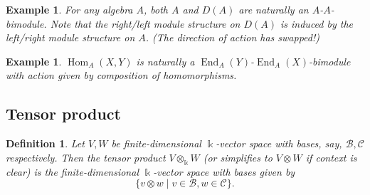 \documentclass[11pt,a4paper]{article}
\numberwithin{equation}{section}
\theoremstyle{all}
\newtheorem{example}[theorem]{Example}
\newtheorem{definition}[theorem]{Definition}
\theoremstyle{remark}
\newcommand{\Z}{\mathbb{Z}}
\newcommand{\CB}{\mathcal{B}}
\newcommand{\CC}{\mathcal{C}}
\newcommand{\Hom}{\operatorname{Hom}\nolimits}
\newcommand{\End}{\operatorname{End}\nolimits}
\newcommand{\defn}[1]{\textsl{\color{darkblue} #1}}
\begin{document}
\begin{example}
For any algebra $A$, both $A$ and $D(A)$ are naturally an $A$-$A$-bimodule.
Note that the right/left module structure on $D(A)$ is induced by the left/right module structure on $A$.  (The direction of action has swapped!)
\end{example}

\begin{example}
$\Hom_A(X,Y)$ is naturally a $\End_A(Y)$-$\End_A(X)$-bimodule with action given by composition of homomorphisms.
\end{example}

%

\subsection{Tensor product}
\begin{definition}
Let $V,W$ be finite-dimensional $\Bbbk$-vector space with bases, say, $\CB, \CC$ respectively.
Then the \defn{tensor product} $V\otimes_{\Bbbk} W$ (or simplifies to $V\otimes W$ if context is clear) is the finite-dimensional $\Bbbk$-vector space with bases given by 
\[
\{ v\otimes w \mid v\in \CB, w\in \CC\}.
\]
\end{definition}
\end{document}
